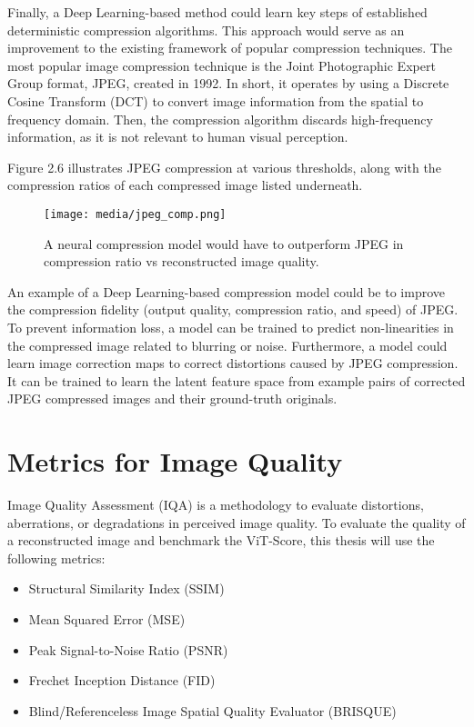 Finally, a Deep Learning-based method could learn key steps of established deterministic compression algorithms.
This approach would serve as an improvement to the existing framework of popular compression techniques.
The most popular image compression technique is the Joint Photographic Expert Group format, JPEG, created in 1992. 
In short, it operates by using a Discrete Cosine Transform (DCT) to convert image information from the spatial to frequency domain. Then,
the compression algorithm discards high-frequency information, as it is not relevant to human visual perception. \citep{Principles}

Figure 2.6 illustrates JPEG compression at various thresholds, along with the compression ratios of each 
compressed image listed underneath.
\begin{figure}[H]
	\begin{center}
	\texttt{[image: media/jpeg\_comp.png]}
	\end{center}
	\caption[JPEG Compression]{A neural compression model would have to 
    outperform JPEG in compression ratio vs reconstructed image quality. \citep{GANs}}
	\end{figure}
An example of a Deep Learning-based compression model could be to improve the compression fidelity (output quality, compression ratio, 
and speed) of JPEG. To prevent information loss, a model can be trained to predict non-linearities 
in the compressed image related to blurring or noise. Furthermore, a model could learn image correction maps to correct distortions 
caused by JPEG compression. 
It can be trained to learn the latent feature space from example pairs of corrected JPEG compressed images and
their ground-truth originals. 


\section{Metrics for Image Quality}

Image Quality Assessment (IQA) is a methodology to evaluate distortions, aberrations, or
degradations in perceived image quality.
To evaluate the quality of a reconstructed image and benchmark the ViT-Score,
this thesis will use the following metrics:

\begin{itemize}
	\item Structural Similarity Index (SSIM)
	\item Mean Squared Error (MSE)
    \item Peak Signal-to-Noise Ratio (PSNR)
	\item Frechet Inception Distance (FID)
	\item Blind/Referenceless Image Spatial Quality Evaluator (BRISQUE)
\end{itemize}

